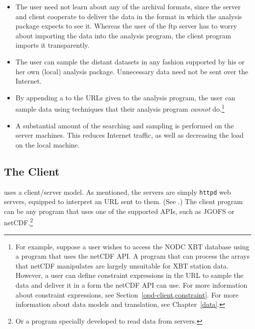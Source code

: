 \begin{itemize}

\item The user need not learn about any of the archival formats, since
the \opendap server and client cooperate to deliver the data in the format
in which the analysis package expects to see it. Whereas the user of
the ftp server has to worry about importing the data into the analysis
program, the \opendap client program imports it transparently.

\item The user can sample the distant datasets in any fashion supported
by his or her own (local) analysis package. Unnecessary data need not
be sent over the Internet.

\item By appending a {\em{}}
to the URLs given to
the analysis program, the user can sample data using techniques that
their analysis program \emph{cannot} do.\footnote{For example, suppose
a user wishes to access the NODC XBT database using a program that
uses the netCDF API. A program that can process the arrays that netCDF
manipulates are largely unsuitable for XBT station data. However, a
user can define constraint expressions in the URL to sample the data
and deliver it in a form the netCDF API can use. For more information
about constraint expressions, see
Section~\ref{opd-client,constraint}. For more information about data
models and translation, see Chapter~\ref{data}.}

\item A substantial amount of the searching and sampling is performed
on the server machines. This reduces Internet traffic, as well as
decreasing the load on the local machine.

\end{itemize}

\subsection{The \opendap Client}
\label{intro,opd-client}

\opendap uses a client/server model. As mentioned, the \opendap
servers are simply {\tt httpd} web servers, equipped to interpret an \opendap URL sent to them. (See .) The \opendap client
program can be any program that uses one of the supported APIs, such
as JGOFS or netCDF.\footnote{Or a program specially developed to 
read data from \opendap servers.}


